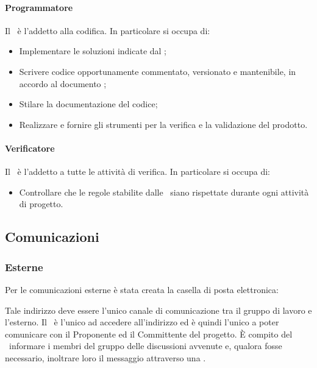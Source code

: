 \documentclass[../NormeDiProgetto.tex]{subfiles}
\begin{document}
				\paragraph{Programmatore\\}
					Il \programmatore\ è l'addetto alla codifica. In particolare si occupa di:
					\begin{itemize}
						\item Implementare le soluzioni indicate dal \progettista;
						\item Scrivere codice opportunamente commentato, versionato e mantenibile, in
						accordo al documento \normediprogetto;
						\item Stilare la documentazione del codice;
						\item Realizzare e fornire gli strumenti per la verifica e la validazione
						del prodotto.
					\end{itemize}
				\paragraph{Verificatore\\}
					Il \verificatore\ è l'addetto a tutte le attività di verifica.
					In particolare si occupa di:
					\begin{itemize}
						\item Controllare che le regole stabilite dalle \normediprogetto\ siano
						rispettate durante ogni attività di progetto.
					\end{itemize}
		\subsection{Comunicazioni}
			\subsubsection{Esterne}
				Per le comunicazioni esterne è stata creata la casella di posta
				elettronica:
				\begin{center}
					\mailkaleidoscode
				\end{center}
				Tale indirizzo deve essere l'unico canale di comunicazione tra il
				gruppo di lavoro e l'esterno.
				Il \responsabilediprogetto\ è l'unico ad accedere
				all'indirizzo ed è quindi l'unico a poter comunicare con il Proponente ed il
				Committente del progetto. È compito del \responsabilediprogetto\ informare
				i membri del gruppo delle discussioni avvenute e,
				qualora fosse necessario, inoltrare loro il messaggio attraverso
				una .
\end{document}
